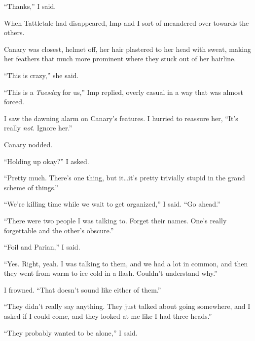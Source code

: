 ``Thanks,'' I said.



When Tattletale had disappeared, Imp and I sort of meandered over towards the others.



Canary was closest, helmet off, her hair plastered to her head with sweat, making her feathers that much more prominent where they stuck out of her hairline.



``This is crazy,'' she said.



``This is a \emph{Tuesday }for us,'' Imp replied, overly casual in a way that was almost forced.



I saw the dawning alarm on Canary's features.  I hurried to reassure her, ``It's really \emph{not}.  Ignore her.''



Canary nodded.



``Holding up okay?''  I asked.



``Pretty much.  There's one thing, but it\ldots it's pretty trivially stupid in the grand scheme of things.''



``We're killing time while we wait to get organized,'' I said.  ``Go ahead.''



``There were two people I was talking to.  Forget their names.  One's really forgettable and the other's obscure.''



``Foil and Parian,'' I said.



``Yes.  Right, yeah.  I was talking to them, and we had a lot in common, and then they went from warm to ice cold in a flash.  Couldn't understand why.''



I frowned.  ``That doesn't sound like either of them.''



``They didn't really say anything.  They just talked about going somewhere, and I asked if I could come, and they looked at me like I had three heads.''



``They probably wanted to be alone,'' I said.




